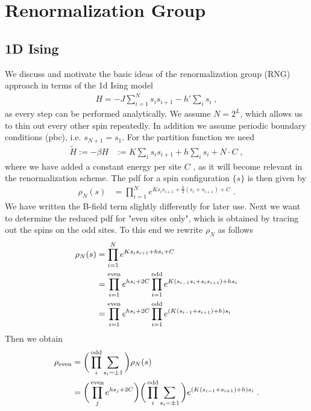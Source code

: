 
\chapter{Renormalization Group}

\section{1D Ising}

We discuss and motivate the basic ideas of the renormalization group (RNG) approach in terms of the 1d Ising model  
%
\begin{align}\label{eq:}
  H = -J \sum_{ i =1}^{N} s_{i}s_{i+1}
  - h' \sum_{i} s_{i} \;,
\end{align}
%
as every step can be performed analytically.
We assume $N=2^{L}$, which allows us to 
thin out every other spin repeatedly. In addition we assume periodic boundary conditions (pbc), i.e. $s_{N+1}=s_{1}$.
For the partition function we need
\begin{align}\label{eq:}
\tilde H := - \beta H &:= 
K\sum_{i} s_{i}s_{i+1} + 
h\sum_{i} s_{i} + N \cdot C\;,
\end{align}
where we have added a constant energy  per site $C$ , as it will become relevant in the renormalization scheme.
The pdf for a spin configuration $\{s\}$ is then given by
\begin{align}\label{eq:RNG:Z}
\rho_{N}(s) &= 
\prod_{i=1}^{N}
e^{K s_{i}s_{i+1} + \frac{h}{2} (s_{i}+s_{i+1}) + C}\;.
\end{align}
We have written the B-field term slightly differently for later use.
Next we want to determine the reduced pdf for "even sites only", which is obtained by   tracing out the  spins on the odd sites. To this end we rewrite $\rho_{N}$ as follows
\begin{align}
\rho_{N}(s) &=\prod_{i=1}^{N} e^{K s_{i}s_{i+1} + hs_{i} + C}\\
&=\prod_{i=1}^\text{even} e^{hs_{i} + 2C}
\prod_{i=1}^\text{odd} e^{K \qty(s_{i-1}s_{i} + s_{i}s_{i+1}) + hs_{i} }
\\
&=\prod_{i=1}^\text{even} e^{hs_{i} + 2C}
\prod_{i=1}^\text{odd} e^{\qty(K \qty(s_{i-1} + s_{i+1}) + h) s_{i} }
\end{align}
%
Then we obtain
\begin{align}\label{eq:RNG:Z2}
\rho_\text{even} &= 
\bigg( \prod_{i}^\text{odd}\sum_{s_{i}=\pm 1}
\bigg)
\rho_N(s)\\
&=\bigg( \prod_{j}^\text{even} e^{h s_{j} + 2 C}   \bigg)
\bigg( \prod_{i}^\text{odd}\sum_{s_{i}=\pm 1}
\bigg)
e^{\qty(K (s_{i-1}+ s_{i+1}) + h )s_{i}}
\;.
\end{align}
